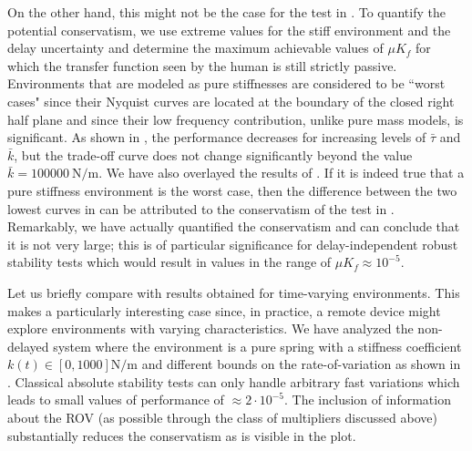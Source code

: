
On the other hand, this might not be the case for the test in . To
quantify the potential conservatism, we use extreme values for
the stiff environment and the delay uncertainty and determine
the maximum achievable values of $\mu K_f$ for which the transfer
function seen by the human is still strictly passive. Environments that
are modeled as pure stiffnesses are considered to be ``worst
cases" since their Nyquist curves are located at the boundary
of the closed right half plane and since their low frequency
contribution, unlike pure mass models, is significant. As shown in , the performance decreases for increasing
levels of $\bar{\tau}$ and $\bar{k}$, but the trade-off curve does not change
significantly beyond the value $\bar{k} = \SI{100000}{\newton\per\metre}$. We have
also overlayed the results of . If it is indeed true
that a pure stiffness environment is the worst case, then the
difference between the two lowest curves in  can
be attributed to the conservatism of the test in .
Remarkably, we have actually quantified the conservatism and
can conclude that it is not very large; this is of particular
significance for delay-independent robust stability tests which
would result in values in the range of $\mu K_f \approx 10^{-5}$.


Let us briefly compare with results obtained for time-varying
environments. This makes a particularly interesting
case since, in practice, a remote device might explore environments
with varying characteristics. We have analyzed
the non-delayed system where the environment is a pure
spring with a stiffness coefficient $k(t) \in [0,1000]\si{\newton\per\metre}$ and
different bounds on the rate-of-variation as shown in .
Classical absolute stability tests can only handle arbitrary
fast variations which leads to small values of performance
of $\approx 2\cdot 10^{-5}$. The inclusion of information about the ROV
(as possible through the class of multipliers discussed above)
substantially reduces the conservatism as is visible in the plot.



